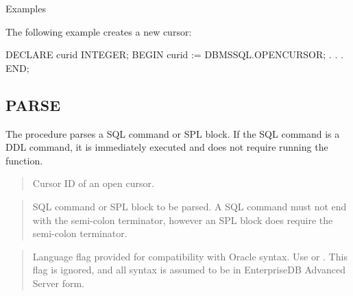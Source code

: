 \documentclass[letterpaper,10pt,english,openany,oneside]{sphinxmanual}
\begin{document}
Examples

The following example creates a new cursor:

%
\begin{sphinxVerbatim}[commandchars=\\\{\}]
DECLARE
    curid           INTEGER;
BEGIN
    curid := DBMS\PYGZus{}SQL.OPEN\PYGZus{}CURSOR;
            .
            .
            .
END;
\end{sphinxVerbatim}

\newpage


\subsection{PARSE}
\label{\detokenize{parse::doc}}\label{\detokenize{parse:parse}}
The  procedure parses a SQL command or SPL block. If the SQL
command is a DDL command, it is immediately executed and does not
require running the  function.
\begin{quote}

\end{quote}


\begin{quote}

Cursor ID of an open cursor.
\end{quote}

\begin{quote}

SQL command or SPL block to be parsed. A SQL command must not end with
the semi-colon terminator, however an SPL block does require the
semi-colon terminator.
\end{quote}

\begin{quote}

Language flag provided for compatibility with Oracle syntax. Use
 or . This flag is ignored,
and all syntax is assumed to be in EnterpriseDB Advanced Server form.
\end{quote}

\end{document}
